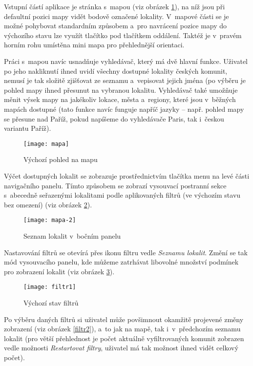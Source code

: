 Vstupní částí aplikace je stránka s~mapou (viz obrázek \ref{mapa}), na níž jsou při defaultní pozici mapy vidět bodově označené lokality. V~mapové části se je možné pohybovat standardním způsobem a~pro navrácení pozice mapy do výchozího stavu lze využít tlačítko pod tlačítkem oddálení. Taktéž je v~pravém horním rohu umístěna mini mapa pro přehlednější orientaci.

Práci s~mapou navíc usnadňuje vyhledávač, který má dvě hlavní funkce. Uživatel po jeho nakliknutí ihned uvidí všechny dostupné lokality českých komunit, nemusí je tak složitě zjišťovat ze seznamu a~vepisovat jejich jména (po výběru je pohled mapy ihned přesunut na vybranou lokalitu. Vyhledávač také umožňuje měnit výsek mapy na jakékoliv lokace, města a~regiony, které jsou v~běžných mapách dostupné (tato funkce navíc funguje napříč jazyky -- např. pohled mapy se přesune nad Paříž, pokud napíšeme do vyhledávače Paris, tak i~českou variantu Paříž).

\begin{figure}
    \centering
    \texttt{[image: mapa]}  
    \caption{Výchozí pohled na mapu}
    \label{mapa}
\end{figure}

Výčet dostupných lokalit se zobrazuje prostřednictvím tlačítka menu na levé části navigačního panelu. Tímto způsobem se zobrazí vysouvací postranní sekce s~abecedně seřazenými lokalitami podle aplikovaných filtrů (ve výchozím stavu bez omezení) (viz obrázek \ref{mapa-2}).

\begin{figure}  
    \centering
    \texttt{[image: mapa-2]}  
    \caption{Seznam lokalit v~bočním panelu}
    \label{mapa-2}
\end{figure}

Nastavování filtrů se otevírá přes ikonu filtru vedle \emph{Seznamu lokalit}. Změní se tak mód vysouvacího panelu, kde můžeme zatrhávat libovolné množství podmínek pro zobrazení lokalit (viz obrázek \ref{filtr1}).

\begin{figure}
    \centering
    \texttt{[image: filtr1]} 
    \caption{Výchozí stav filtrů}
    \label{filtr1}
\end{figure}

Po výběru daných filtrů si uživatel může povšimnout okamžitě projevené změny zobrazení (viz obrázek \ref{filtr2}), a~to jak na mapě, tak i~v~předchozím seznamu lokalit (pro větší přehlednost je počet aktuálně vyfiltrovaných komunit zobrazen vedle možnosti \emph{Restartovat filtry}, uživatel má tak možnost ihned vidět celkový počet).

